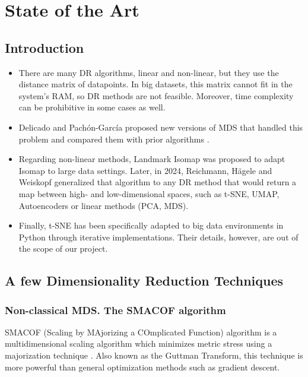 \section{State of the Art}

\subsection{Introduction}

\begin{itemize}
    \item There are many DR algorithms, linear and non-linear, but they use the distance matrix of datapoints. In big datasets, this matrix cannot fit in the system's RAM, so DR methods are not feasible. Moreover, time complexity can be prohibitive in some cases as well.
    \item Delicado and Pachón-García proposed new versions of MDS that handled this problem and compared them with prior algorithms \cite{Delicado2024MDSBigData}.
    \item Regarding non-linear methods, Landmark Isomap \cite{deSilvaTenenbaum2002} was proposed to adapt Isomap to large data settings. Later, in 2024, Reichmann, Hägele and Weiskopf generalized that algorithm to any DR method that would return a map between high- and low-dimensional spaces, such as t-SNE, UMAP, Autoencoders or linear methods (PCA, MDS).
    \item Finally, t-SNE has been specifically adapted to big data environments in Python through iterative implementations. Their details, however, are out of the scope of our project.
\end{itemize}

\subsection{A few Dimensionality Reduction Techniques}

\subsubsection{Non-classical MDS. The SMACOF algorithm}

SMACOF (Scaling by MAjorizing a COmplicated Function) algorithm is a multidimensional scaling algorithm which minimizes metric stress using a majorization technique \cite{borg1997modern}. Also known as the Guttman Transform, this technique is more powerful than general optimization methods such as gradient descent.

